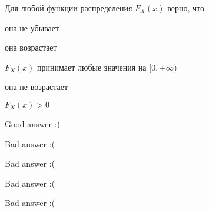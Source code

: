 
\begin{question}
Для любой функции распределения \(F_X(x)\) верно, что
\begin{answerlist}
  \item она не убывает
  \item она возрастает
  \item \(F_{X}(x)\) принимает любые значения на \([0, +\infty)\)
  \item она не возрастает
  \item \(F_X(x) > 0\)
\end{answerlist}
\end{question}

\begin{solution}
\begin{answerlist}
  \item Good answer :)
  \item Bad answer :(
  \item Bad answer :(
  \item Bad answer :(
  \item Bad answer :(
\end{answerlist}
\end{solution}

